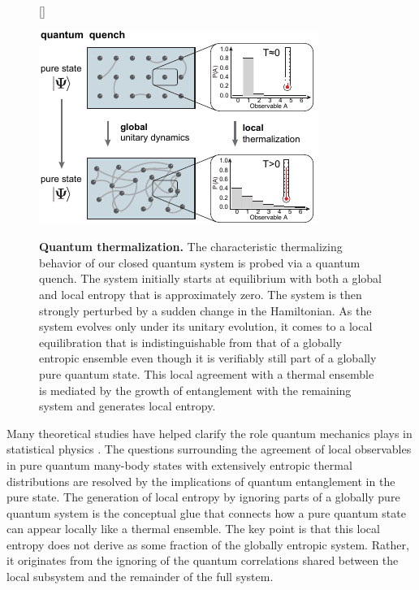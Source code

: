 
\begin{figure}
[\FBwidth]
{\caption{\textbf{Quantum thermalization.} The characteristic thermalizing behavior of our closed quantum system is probed via a quantum quench. The system initially starts at equilibrium with both a global and local entropy that is approximately zero. The system is then strongly perturbed by a sudden change in the Hamiltonian. As the system evolves only under its unitary evolution, it comes to a local equilibration that is indistinguishable from that of a globally entropic ensemble even though it is verifiably still part of a globally pure quantum state. This local agreement with a thermal ensemble is mediated by the growth of entanglement with the remaining system and generates local entropy.} \label{fig:eth}}
{\includegraphics[width=3 in]{figures/ch4/fig1.pdf}} 
\end{figure}

Many theoretical studies have helped clarify the role quantum mechanics plays in statistical physics \cite{Deutsch1991, Rigol2008, Jensen1985, Srednicki1994, Santos2012, Deutsch2013, DAlessio2016}. The questions surrounding the agreement of local observables in pure quantum many-body states with extensively entropic thermal distributions are resolved by the implications of quantum entanglement in the pure state. The generation of local entropy by ignoring parts of a globally pure quantum system is the conceptual glue that connects how a pure quantum state can appear locally like a thermal ensemble. The key point is that this local entropy does not derive as some fraction of the globally entropic system. Rather, it originates from the ignoring of the quantum correlations shared between the local subsystem and the remainder of the full system.

